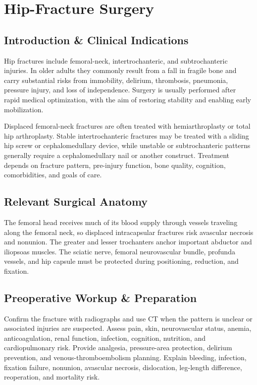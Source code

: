 \chapter{Hip-Fracture Surgery}

\section*{Introduction \& Clinical Indications}
Hip fractures include femoral-neck, intertrochanteric, and subtrochanteric injuries. In older adults they commonly result from a fall in fragile bone and carry substantial risks from immobility, delirium, thrombosis, pneumonia, pressure injury, and loss of independence. Surgery is usually performed after rapid medical optimization, with the aim of restoring stability and enabling early mobilization.

Displaced femoral-neck fractures are often treated with hemiarthroplasty or total hip arthroplasty. Stable intertrochanteric fractures may be treated with a sliding hip screw or cephalomedullary device, while unstable or subtrochanteric patterns generally require a cephalomedullary nail or another construct. Treatment depends on fracture pattern, pre-injury function, bone quality, cognition, comorbidities, and goals of care.

\section*{Relevant Surgical Anatomy}
The femoral head receives much of its blood supply through vessels traveling along the femoral neck, so displaced intracapsular fractures risk avascular necrosis and nonunion. The greater and lesser trochanters anchor important abductor and iliopsoas muscles. The sciatic nerve, femoral neurovascular bundle, profunda vessels, and hip capsule must be protected during positioning, reduction, and fixation.

\section*{Preoperative Workup \& Preparation}
Confirm the fracture with radiographs and use CT when the pattern is unclear or associated injuries are suspected. Assess pain, skin, neurovascular status, anemia, anticoagulation, renal function, infection, cognition, nutrition, and cardiopulmonary risk. Provide analgesia, pressure-area protection, delirium prevention, and venous-thromboembolism planning. Explain bleeding, infection, fixation failure, nonunion, avascular necrosis, dislocation, leg-length difference, reoperation, and mortality risk.

